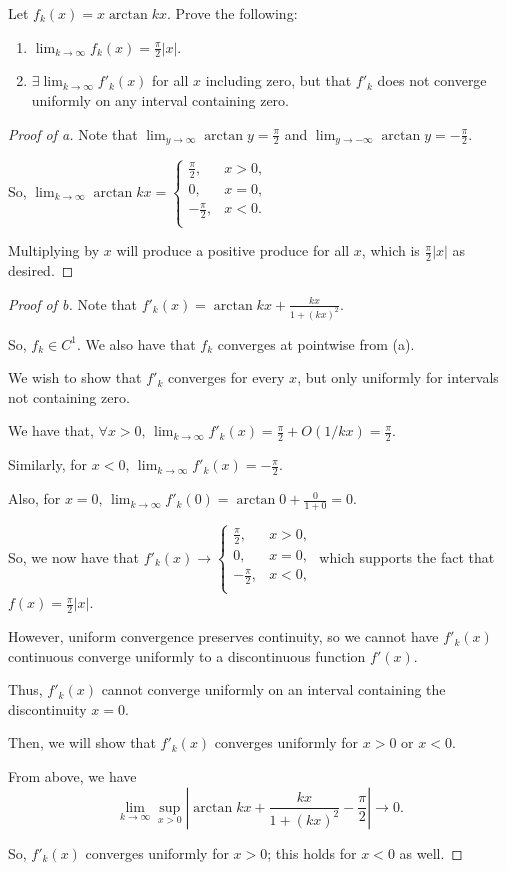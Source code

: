 \documentclass[../hw3]{subfiles}
\begin{document}
\begin{problem}
Let $f_k(x)=x\arctan{kx}$.
Prove the following:
\begin{enumerate}[label=\alph*)]
	\item $\lim_{k \to \infty} f_k(x)=\frac{\pi}{2}|x|$.
	\item  $\exists \lim_{k \to \infty} f'_k(x)$ for all $x$ including zero, but that  $f'_k$ does not converge uniformly on any interval containing zero.
\end{enumerate}
\end{problem}
\begin{proof}[Proof of a]
	Note that  $\lim_{y \to \infty} \arctan{y} =\frac{\pi}{2} $ and $\lim_{y \to-\infty} \arctan{y} =-\frac{\pi}{2} $.

	So, $\lim_{k \to \infty} \arctan{kx}=\begin{cases}
			\frac{\pi}{2},  & x>0, \\
			0,              & x=0, \\
			-\frac{\pi}{2}, & x<0. \\
		\end{cases} $

	Multiplying by $x$ will produce a positive produce for all  $x$, which is  $\frac{\pi}{2}|x|$ as desired.
\end{proof}
\begin{proof}[Proof of b]
	Note that $f'_k(x)=\arctan{kx} + \frac{kx}{1+{(kx)}^2} $.

	So, $f_k\in C^1$. We also have that $f_k$ converges at pointwise from (a).

	We wish to show that $f'_k$ converges for every $x$, but only uniformly for intervals not containing zero.

	We have that, $\forall x>0,\, \lim_{k \to \infty} f'_k(x)=\frac{\pi}{2} + O(1 / kx) = \frac{\pi}{2} $.

	Similarly, for $x<0,\, \lim_{k \to \infty} f'_k(x)=-\frac{\pi}{2} $.

	Also, for $x=0,\, \lim_{k \to \infty} f'_k(0)=\arctan{0}+\frac{0}{1+0}=0$.

	So, we now have that $f'_k(x) \to \begin{cases}
			\frac{\pi}{2},  & x>0, \\
			0,              & x=0, \\
			-\frac{\pi}{2}, & x<0, \\
		\end{cases}$
	which supports the fact that $f(x)=\frac{\pi}{2}|x|$.

	However, uniform convergence preserves continuity, so we cannot have $f'_k(x)$ continuous converge uniformly to a discontinuous function $f'(x)$.

	Thus, $f'_k(x)$ cannot converge uniformly on an interval containing the discontinuity $x=0$.

	Then, we will show that $f'_k(x)$ converges uniformly for  $x>0$ or  $x<0$.

	From above, we have \[
		\lim_{k \to \infty} \sup_{x>0}\left| \arctan{kx} + \frac{kx}{1 + (kx)^2} - \frac{\pi}{2} \right|  \to 0
		.\]

	So, $f'_k(x)$ converges uniformly for $x>0$; this holds for $x<0$ as well.
\end{proof}
\end{document}
